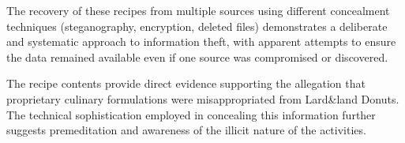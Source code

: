 The recovery of these recipes from multiple sources using different concealment techniques (steganography, encryption, deleted files) demonstrates a deliberate and systematic approach to information theft, with apparent attempts to ensure the data remained available even if one source was compromised or discovered.

The recipe contents provide direct evidence supporting the allegation that proprietary culinary formulations were misappropriated from Lard\&land Donuts. The technical sophistication employed in concealing this information further suggests premeditation and awareness of the illicit nature of the activities.